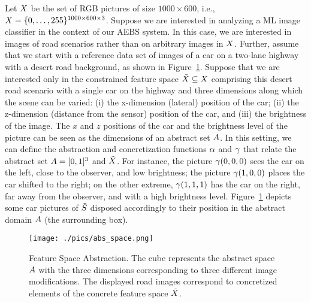 \begin{example}\label{ex:abs}

Let $X$ be the set of RGB pictures of size $1000\times 600$, i.e., $X = \{0,\dots,255\}^{1000\times600\times3}$.
Suppose we are interested in analyzing a ML image classifier in the 
context of our AEBS system. In this case, we are interested in
images of road scenarios rather than on arbitrary images in $X$. 
Further, assume that we start with a reference data set of images
of a car on a two-lane highway with a desert road background, as
shown in Figure~\ref{fig:X_and_A}.
Suppose that we are interested only in the constrained feature space
$\tilde{X} \subseteq X$ comprising this desert road scenario with
a single car on the highway and three dimensions along which the
scene can be varied:
(i) the x-dimension (lateral) position of the car; 
(ii) the z-dimension (distance from the sensor) position
of the car, and (iii) the brightness of the image.
%
The $x$ and $z$ positions of the car
and the brightness level of the picture can be seen as the dimensions of 
an abstract set $A$. In this setting, we can define the abstraction and concretization functions $\alpha$ and $\gamma$
that relate the abstract set $A = [0,1]^3$ and $\tilde{X}$. For instance, the
picture $\gamma(0,0,0)$ sees the car on the left, close to the observer, and low brightness;
the picture $\gamma(1,0,0)$ places the car shifted to the right;
on the other extreme, $\gamma(1,1,1)$ has the car on the right, far away from the observer, and  
with a high brightness level. Figure~\ref{fig:X_and_A} depicts some car pictures of $\tilde{S}$
disposed accordingly to their position in the abstract domain $A$ (the surrounding box).
	
	\begin{figure}
		\centering
		\texttt{[image: ./pics/abs\_space.png]}
		\caption{Feature Space Abstraction. The cube represents the abstract space $A$ with the three dimensions corresponding to three different image modifications. The displayed road images correspond to concretized elements of the concrete feature space $\tilde{X}$.\label{fig:X_and_A}}
	\end{figure}
\end{example}

